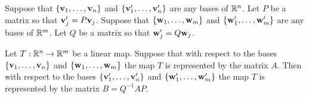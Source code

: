 \documentclass[10pt, a4paper]{article}
\begin{document}
\begin{corollary}
    Suppose that $\{\mathbf{v}_1, \dotsc, \mathbf{v}_n\}$ and $\{\mathbf{v}'_1, \dotsc, \mathbf{v}'_n\}$ are any bases of $\mathbb{R} ^ n$.
    Let $P$ be a matrix so that $\mathbf{v}'_j = P\mathbf{v}_j$.
    Suppose that $\{\mathbf{w}_1, \dotsc, \mathbf{w}_m\}$ and $\{\mathbf{w}'_1, \dotsc, \mathbf{w}'_m\}$ are any bases of $\mathbb{R} ^ m$.
    Let $Q$ be a matrix so that $\mathbf{w}'_j = Q\mathbf{w}_j$.

    Let $T : \mathbb{R} ^ n \rightarrow \mathbb{R} ^ m$ be a linear map.
    Suppose that with respect to the bases $\{\mathbf{v}_1, \dotsc, \mathbf{v}_n\}$ and $\{\mathbf{w}_1, \dotsc, \mathbf{w}_m\}$ the map $T$ is represented by the matrix $A$.
    Then with respect to the bases $\{\mathbf{v}'_1, \dotsc, \mathbf{v}'_n\}$ and $\{\mathbf{w}'_1, \dotsc, \mathbf{w}'_m\}$ the map $T$ is represented by the matrix $B = Q ^ {-1}AP$.
\end{corollary}
\end{document}
